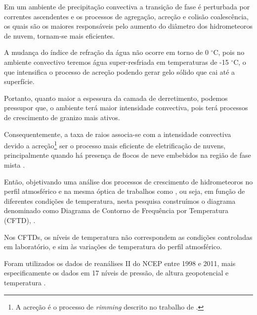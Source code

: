 
Em um ambiente de precipitação convectiva a transição de fase é perturbada por correntes ascendentes e os processos de agregação, acreção e colisão coalescência, os quais são os maiores responsáveis pelo aumento do diâmetro dos hidrometeoros de nuvem, tornam-se mais eficientes. 

A mudança do índice de refração da água não ocorre em torno de 0 $^{\circ}$C, pois no ambiente convectivo teremos água super-resfriada em temperaturas de -15 $^{\circ}$C, o que intensifica o processo de acreção podendo gerar gelo sólido que cai até a superfície.

Portanto, quanto maior a espessura da camada de derretimento, podemos pressupor que, o ambiente terá maior intensidade convectiva, pois terá processos de crescimento de granizo mais ativos.

Consequentemente, a taxa de raios associa-se com a intensidade convectiva devido a acreção\footnote{A acreção é o processo de \textit{rimming} descrito no trabalho de .} ser o processo mais eficiente de eletrificação de nuvens, principalmente quando há presença de flocos de neve embebidos na região de fase mista \cite{Takahashi1978,Takahashi2002}. 

Então, objetivando uma análise dos processos de crescimento de hidrometeoros no perfil atmosférico e na mesma óptica de trabalhos como , ou seja, em função de diferentes condições de temperatura, nesta pesquisa construímos o diagrama denominado como Diagrama de Contorno de Frequência por Temperatura (CFTD), .

Nos CFTDs, os níveis de temperatura não correspondem as condições controladas em laboratório, e sim às variações de temperatura do perfil atmosférico. 

Foram utilizados os dados de reanálises II do NCEP entre 1998 e 2011, mais especificamente os dados em 17 níveis de pressão, de altura geopotencial e temperatura \cite{kanamitsu}. 

